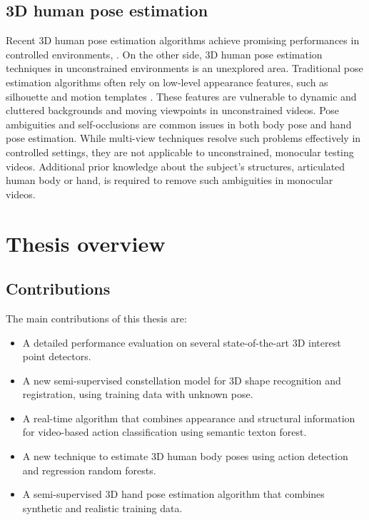 \subsection{3D human pose estimation} 


Recent 3D human pose estimation algorithms achieve promising performances in controlled environments, \eg \cite{Rogez2012, Pons-Moll2011, Sigal2012}. On the other side, 3D human pose estimation techniques in unconstrained environments is an unexplored area.       
Traditional pose estimation algorithms often rely on low-level appearance features, such as silhouette and motion templates \cite{Bissacco2007, Rogez2012, Ionescu2011, Navaratnam2006}. These features are vulnerable to dynamic and cluttered backgrounds and moving viewpoints in unconstrained videos. 
Pose ambiguities and self-occlusions are common issues in both body pose and hand pose estimation. While multi-view techniques resolve such problems effectively in controlled settings, they are not applicable to unconstrained, monocular testing videos. Additional prior knowledge about the subject's structures, \eg articulated human body or hand, is required to remove such ambiguities in monocular videos. 

\section{Thesis overview}

\subsection{Contributions}

The main contributions of this thesis are:
\begin{itemize}
	\item A detailed performance evaluation on several state-of-the-art 3D interest point detectors.
	\item A new semi-supervised constellation model for 3D shape recognition and registration, using training data with unknown pose. 
	\item A real-time algorithm that combines appearance and structural information for video-based action classification using semantic texton forest. 
	\item A new technique to estimate 3D human body poses using action detection and regression random forests. 
	\item A semi-supervised 3D hand pose estimation algorithm that combines synthetic and realistic training data. 
\end{itemize}

